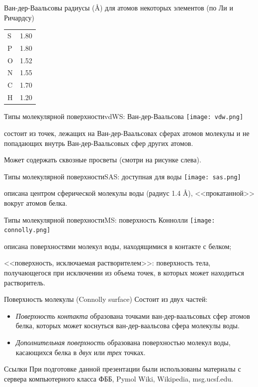 \documentclass{beamer}
\begin{document}
    \begin{frame}{Ван-дер-Ваальсовы радиусы (\AA) для атомов
        некоторых элементов (по Ли и Ричардсу)}
        \begin{tabular}{ l l }
            S & 1.80 \\
            P & 1.80 \\
            O & 1.52 \\
            N & 1.55 \\
            C & 1.70 \\
            H & 1.20 \\
        \end{tabular}
    \end{frame}

    \begin{frame}{Типы молекулярной поверхности}{vdWS: Ван-дер-Ваальсова}
        \texttt{[image: vdw.png]}

        состоит из точек, лежащих на Ван-дер-Ваальсовах сферах атомов молекулы и
        не попадающих внутрь Ван-дер-Ваальсовых сфер других атомов.

        Может содержать сквозные просветы (смотри на рисунке слева).
    \end{frame}

    \begin{frame}{Типы молекулярной поверхности}{SAS: доступная для воды}
        \texttt{[image: sas.png]}

        описана центром сферической молекулы воды (радиус 1.4 \AA),
        <<прокатанной>> вокруг атомов белка.
    \end{frame}

    \begin{frame}{Типы молекулярной поверхности}{MS: поверхность Коннолли}
        \texttt{[image: connolly.png]}

        описана поверхностями молекул воды, находящимися в контакте с белком;

        <<поверхность, исключаемая растворителем>>:
        поверхность тела, получающегося при исключении из объема точек,
        в которых может находиться растворитель.
    \end{frame}

    \begin{frame}{Поверхность молекулы (Connolly surface)}
        Состоит из двух частей:
        \begin{itemize}
        \item \emph{Поверхность контакта} образована точками ван-дер-ваальсовых
            сфер атомов белка, которых может коснуться ван-дер-ваальсова сфера
            молекулы воды.
        \item \emph{Дополнительная поверхность} образована поверхностью
            молекул воды, касающихся белка в \emph{двух} или \emph{трех} точках.
        \end{itemize}
    \end{frame}

    \begin{frame}{Ссылки}
        При подготовке данной презентации были использованы материалы с
        сервера компьютерного класса ФББ, Pymol Wiki, Wikipedia, msg.ucsf.edu.
    \end{frame}
\end{document}

